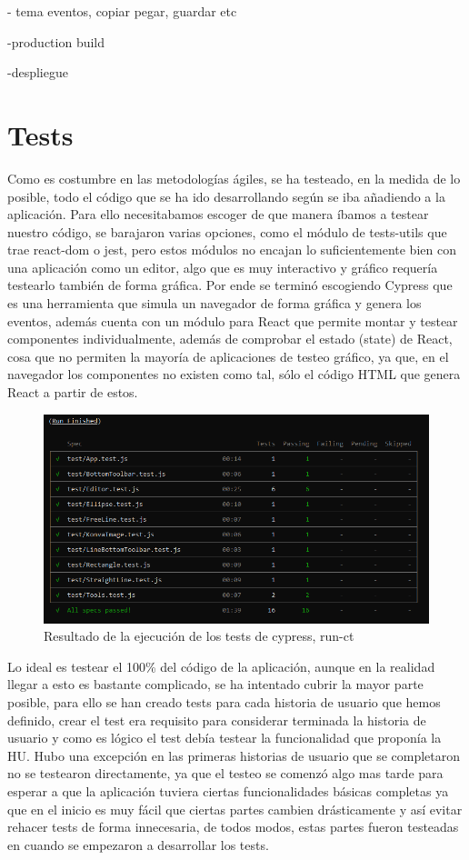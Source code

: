 - tema eventos, copiar pegar, guardar etc

-production build

-despliegue

\fi

\newpage
\section{Tests}

Como es costumbre en las metodologías ágiles, se ha testeado, en la medida de lo posible,
todo el código que se ha ido desarrollando según se iba añadiendo a la aplicación.
Para ello necesitabamos escoger de que manera íbamos a testear nuestro código, se barajaron
varias opciones, como el módulo de tests-utils que trae react-dom \cite{react-dom} o jest, 
pero estos módulos no encajan lo suficientemente bien con una aplicación como un editor, 
algo que es muy interactivo y gráfico requería testearlo también de forma gráfica. Por ende
se terminó escogiendo Cypress \cite{cypress} que es una herramienta que simula un navegador de
forma gráfica y genera los eventos, además cuenta con un módulo para React \cite{cypressReact} que permite montar
y testear componentes individualmente, además de comprobar el estado (state) de React, cosa
que no permiten la mayoría de aplicaciones de testeo gráfico, ya que, en el navegador los
componentes no existen como tal, sólo el código HTML que genera React a partir de estos.

\begin{figure}[!h]
  \centering
  \includegraphics[scale=0.6]{img/TestsOK.png}
  \caption{Resultado de la ejecución de los tests de cypress, run-ct}
\end{figure}

Lo ideal es testear el 100\% del código de la aplicación, aunque en la realidad llegar a esto
es bastante complicado, se ha intentado cubrir la mayor parte posible, para ello se han creado
tests para cada historia de usuario que hemos definido, crear el test era requisito para considerar
terminada la historia de usuario y como es lógico el test debía testear la funcionalidad que 
proponía la HU. Hubo una excepción en las primeras historias de usuario que se completaron
no se testearon directamente, ya que el testeo se comenzó algo mas tarde para esperar a 
que la aplicación tuviera ciertas funcionalidades básicas completas ya que en el inicio es
muy fácil que ciertas partes cambien drásticamente y así evitar rehacer tests de forma innecesaria,
de todos modos, estas partes fueron testeadas en cuando se empezaron a desarrollar los tests.

